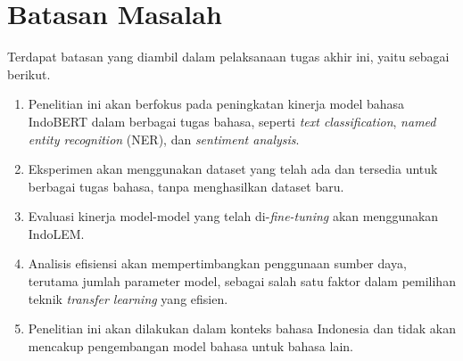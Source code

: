 \section{Batasan Masalah}
\label{sec:batasan-masalah}

Terdapat batasan yang diambil dalam pelaksanaan tugas akhir ini, yaitu sebagai berikut.

\begin{enumerate}
    \item Penelitian ini akan berfokus pada peningkatan kinerja model bahasa IndoBERT dalam berbagai tugas bahasa, seperti \textit{text classification},  \textit{named entity recognition} (NER), dan \textit{sentiment analysis}.
    \item Eksperimen akan menggunakan dataset yang telah ada dan tersedia untuk berbagai tugas bahasa, tanpa menghasilkan dataset baru.
    \item Evaluasi kinerja model-model yang telah di-\textit{fine-tuning} akan menggunakan IndoLEM.
    \item Analisis efisiensi akan mempertimbangkan penggunaan sumber daya, terutama jumlah parameter model, sebagai salah satu faktor dalam pemilihan teknik \textit{transfer learning} yang efisien.
    \item Penelitian ini akan dilakukan dalam konteks bahasa Indonesia dan tidak akan mencakup pengembangan model bahasa untuk bahasa lain.
\end{enumerate}
